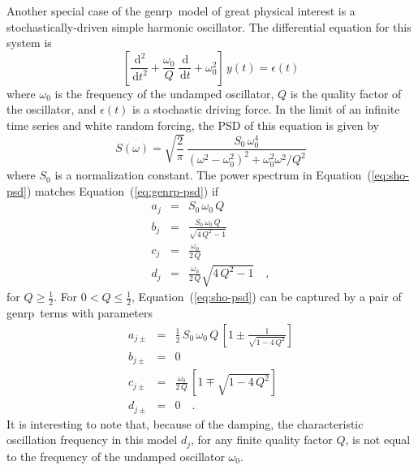 \documentclass[manuscript, letterpaper]{aastex6}
\newcommand{\project}[1]{\textsf{#1}}
\newcommand{\genrp}{\project{genrp}}
\renewcommand{\eqref}[1]{\ref{eq:#1}}
\newcommand{\Eq}[1]{Equation~(\eqref{#1})}
\newcommand{\eq}[1]{\Eq{#1}}
\newcommand{\eqlabel}[1]{\label{eq:#1}}
\newcommand{\dd}{\ensuremath{\,\mathrm{d}}}
\begin{document}
Another special case of the \genrp\ model of great physical interest is a
stochastically-driven simple harmonic oscillator.
The differential equation for this system is
\begin{equation}
    \left[\frac{\dd^2}{\dd t^2} + \frac{\omega_0}{Q}\,\frac{\dd}{\dd t}
    + \omega_0^2\right]\, y(t) = \epsilon(t)
\end{equation}
where $\omega_0$ is the frequency of the undamped oscillator, $Q$ is the
quality factor of the oscillator, and $\epsilon(t)$ is a stochastic driving
force.
In the limit of an infinite time series and white random forcing, the PSD of
this equation is given by \citep{Anderson:1990}
\begin{equation}\eqlabel{sho-psd}
S(\omega) = \sqrt{\frac{2}{\pi}}\,\frac{S_0\,\omega_0^4}
    {(\omega^2-\omega_0^2)^2 + \omega_0^2\omega^2/Q^2}
\end{equation}
where $S_0$ is a normalization constant.
The power spectrum in \eq{sho-psd} matches \eq{genrp-psd} if
\begin{eqnarray}
a_j &=& S_0\,\omega_0\,Q \\
b_j &=& \frac{S_0\,\omega_0\,Q}{\sqrt{4\,Q^2-1}} \\
c_j &=& \frac{\omega_0}{2\,Q}\\
d_j &=& \frac{\omega_0}{2\,Q} \sqrt{4\,Q^2-1} \quad,
\end{eqnarray}
for $Q \ge \frac{1}{2}$.
For $0 < Q \le \frac{1}{2}$, \eq{sho-psd} can be captured by a pair of \genrp\
terms with parameters
\begin{eqnarray}
a_{j\pm} &=& \frac{1}{2}\,S_0\,\omega_0\,Q\,\left[ 1 \pm
        \frac{1}{\sqrt{1-4\,Q^2}}\right] \\
b_{j\pm} &=& 0 \\
    c_{j\pm} &=& \frac{\omega_0}{2\,Q}\,\left[1 \mp \sqrt{1-4\,Q^2}\right] \\
d_{j\pm} &=& 0 \quad.
\end{eqnarray}
It is interesting to note that, because of the damping, the characteristic
oscillation frequency in this model $d_j$, for any finite quality factor $Q$,
is not equal to the frequency of the undamped oscillator $\omega_0$.
\end{document}

